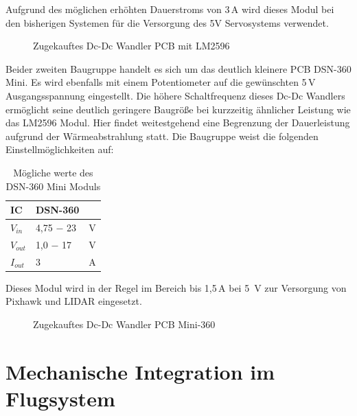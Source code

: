 Aufgrund des möglichen erhöhten Dauerstroms von 3\,A wird dieses Modul bei den bisherigen Systemen für die Versorgung des 5V Servosystems verwendet.

\begin{figure}[H]
\centering
{}
\caption{Zugekauftes Dc-Dc Wandler PCB mit LM2596} 
\label{fig:Zugekauftes Dc-Dc Wandler PCB mit LM2596}
\end{figure}

Beider zweiten Baugruppe handelt es sich um das deutlich kleinere PCB DSN-360 Mini.
Es wird ebenfalls mit einem Potentiometer auf die gewünschten 5\,V Ausgangsspannung eingestellt. Die höhere Schaltfrequenz dieses Dc-Dc Wandlers ermöglicht seine deutlich geringere Baugröße bei kurzzeitig ähnlicher Leistung wie das LM2596 Modul. Hier findet weitestgehend eine Begrenzung der Dauerleistung aufgrund der Wärmeabstrahlung statt.
Die Baugruppe weist die folgenden Einstellmöglichkeiten auf:

\begin{table}[h]
\centering
\begin{tabular}{|l|l|l|}
\hline
IC    & DSN-360    &   \\ \hline
$V_{in}$  & 4,75 $-$ 23 & V \\ \hline
$V_{out}$ & 1,0 $-$ 17  & V \\ \hline
$I_{out}$ & 3         & A \\ \hline
\end{tabular}
\caption{Mögliche werte des DSN-360 Mini Moduls}
\label{Mögliche werte des DSN-360 Mini Moduls}
\end{table}

Dieses Modul wird in der Regel im Bereich bis 1,5\,A bei 5 \,V zur Versorgung von Pixhawk und LIDAR eingesetzt.

\begin{figure}[H]
\centering
{}
\caption{Zugekauftes Dc-Dc Wandler PCB Mini-360} 
\label{fig:Zugekauftes Dc-Dc Wandler PCB Mini-360}
\end{figure}

\section{Mechanische Integration im Flugsystem}


